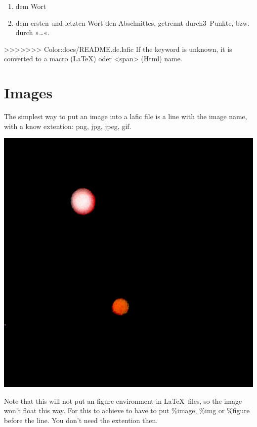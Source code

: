 \documentclass{scrartcl}
\begin{document}
\begin{enumerate}
\item dem Wort
\item dem ersten und letzten Wort den Abschnittes,
  getrennt durch3~Punkte, bzw. durch »…«.
\end{enumerate}


{>>>>>>> Color:docs/README.de.lafic
If the keyword is
unknown, it is converted to a macro (LaTeX) oder <span>
(Html) name.\\}

\section{Images}

{The simplest way to put an image into a lafic file is a
line with the image name, with a know extention: png, jpg,
jpeg, gif.\\}

{\centering\includegraphics[width=.50\linewidth]{Image.png}}

{Note that this will not put an figure environment in \LaTeX\ 
files, so the image won't float this way. For this to
achieve to have to put \%image, \%img or \%figure before the
line. You don't need the extention then.\\}
\end{document}
